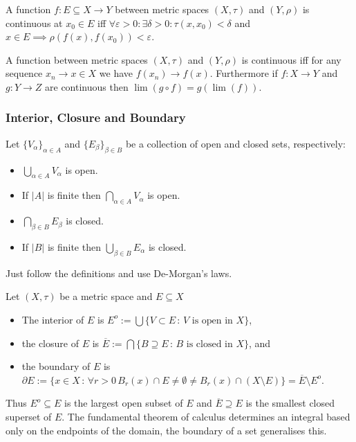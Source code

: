\begin{multicols}{2}
\begin{definition}[Continuous]
A function $f:E\subseteq X\to Y$ between metric spaces $(X,\tau)$ and $(Y,\rho)$ is continuous at $x_0\in E$ iff $\forall\varepsilon>0:\exists\delta>0: \tau(x,x_0)<\delta$ and $x\in E \implies \rho(f(x),f(x_0))<\varepsilon$.
\end{definition}

\begin{theorem}[10.28 and 10.29]
A function between metric spaces $(X,\tau)$ and $(Y,\rho)$ is continuous iff for any sequence $x_n\to x\in X$ we have $f(x_n)\to f(x)$. Furthermore if $f:X\to Y$ and $g:Y\to Z$ are continuous then $\lim(g\circ f) = g(\lim(f))$.
\end{theorem}

\subsubsection*{Interior, Closure and Boundary}
\begin{theorem}[10.31]
Let $\{V_\alpha\}_{\alpha\in A}$ and $\{E_\beta\}_{\beta\in B}$ be a collection of open and closed sets, respectively:
    \begin{itemize}
        \item{$\bigcup_{\alpha\in A}V_\alpha$ is open.}
        \item{If $|A|$ is finite then $\bigcap_{\alpha\in A}V_\alpha$ is open.}
        \item{$\bigcap_{\beta\in B}E_\beta$ is closed.}
        \item{If $|B|$ is finite then $\bigcup_{\beta\in B}E_\alpha$ is closed.}
    \end{itemize}
\end{theorem}
\begin{proof1}
Just follow the definitions and use De-Morgan's laws.
\end{proof1}

\begin{definition}
Let $(X,\tau)$ be a metric space and $E\subseteq X$
    \begin{itemize}
        \item{The interior of $E$ is $E^o := \bigcup \{V\subset E\,:\,V\text{ is open in }X\}$,}
        \item{the closure of $E$ is $\overline{E}:=\bigcap\{B\supseteq E\,:\,B\text{ is closed in }X\}$, and}
        \item{the boundary of $E$ is $\partial E := \{x\in X\,:\,\forall r>0\,B_r(x)\cap E\neq\emptyset\neq B_r(x)\cap(X\setminus E)\} = \overline{E}\setminus E^o$.}
    \end{itemize}
Thus $E^o\subseteq E$ is the largest open subset of $E$ and $\overline{E}\supseteq E$ is the smallest closed superset of $E$. The fundamental theorem of calculus determines an integral based only on the endpoints of the domain, the boundary of a set generalises this.
\end{definition}


\end{multicols}
